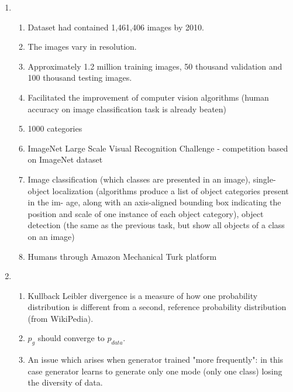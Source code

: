 \documentclass{article}
\begin{document}
\begin{enumerate}
	\item \begin{enumerate}
	\item Dataset had contained 1,461,406 images by 2010.
	\item The images vary in resolution.
	\item Approximately 1.2 million training images, 50 thousand validation and 100 thousand testing images.
	\item Facilitated the improvement of computer vision algorithms (human accuracy on image classification task is already beaten)
	\item 1000 categories
	\item ImageNet Large Scale Visual Recognition Challenge - competition based on ImageNet dataset
	\item Image classification (which classes are presented in an image), single-object localization (algorithms produce a list of object categories present in the im- age, along with an axis-aligned bounding box indicating the position and scale of one instance of each object category), object detection (the same as the previous task, but show all objects of a class on an image)
	\item Humans through Amazon Mechanical Turk platform 
\end{enumerate}

\item \begin{enumerate}
	\item Kullback Leibler divergence is a measure of how one probability distribution is different from a second, reference probability distribution (from WikiPedia).
	\item $p_g$ should converge to $p_{data}$.
	\item An issue which arises when generator trained "more frequently": in this case generator learns to generate only one mode (only one class) losing the diversity of data.
\end{enumerate}


\end{enumerate}
\end{document}
